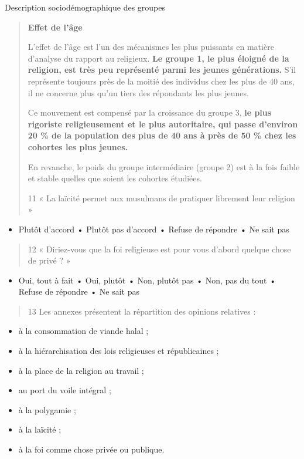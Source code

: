 Description sociodémographique des groupes

\begin{quote}
\textbf{Effet de l'âge}

L'effet de l'âge est l'un des mécanismes les plus puissants en matière
d'analyse du rapport au religieux. \textbf{Le groupe 1, le plus éloigné
de la religion, est très peu représenté parmi les jeunes générations.}
S'il représente toujours près de la moitié des individus chez les plus
de 40 ans, il ne concerne plus qu'un tiers des répondants les plus
jeunes.

Ce mouvement est compensé par la croissance du groupe 3, \textbf{le plus
rigoriste religieusement et le plus autoritaire, qui passe d'environ 20
\% de la population des plus de 40 ans à près de 50 \% chez les cohortes
les plus jeunes.}

En revanche, le poids du groupe intermédiaire (groupe 2) est à la fois
faible et stable quelles que soient les cohortes étudiées.

11 « La laïcité permet aux musulmans de pratiquer librement leur
religion »
\end{quote}

\begin{itemize}
\item
  Plutôt d'accord • Plutôt pas d'accord • Refuse de répondre • Ne sait
  pas
\end{itemize}

\begin{quote}
12 « Diriez-vous que la foi religieuse est pour vous d'abord quelque
chose de privé ? »
\end{quote}

\begin{itemize}
\item
  Oui, tout à fait • Oui, plutôt • Non, plutôt pas • Non, pas du tout •
  Refuse de répondre • Ne sait pas
\end{itemize}

\begin{quote}
13 Les annexes présentent la répartition des opinions relatives :
\end{quote}

\begin{itemize}
\item
  à la consommation de viande halal ;
\item
  à la hiérarchisation des lois religieuses et républicaines ;
\item
  à la place de la religion au travail ;
\item
  au port du voile intégral ;
\item
  à la polygamie ;
\item
  à la laïcité ;
\item
  à la foi comme chose privée ou publique.
\end{itemize}

